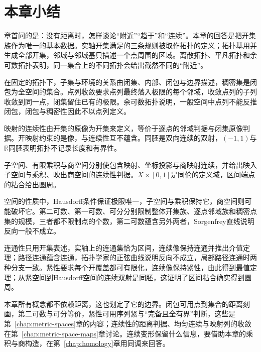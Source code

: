 \section{本章小结}
\label{sec:topo-summary}

章首问的是：没有距离时，怎样谈论“附近”“趋于”和“连续”。本章的回答是把开集族作为唯一的基本数据。实轴开集满足的三条规则被取作拓扑的定义；拓扑基用并生成全部开集，邻域与邻域基只描述一个点周围的区域。离散拓扑、平凡拓扑和余可数拓扑表明，同一集合上的不同拓扑会给出截然不同的“附近”。

在固定的拓扑下，子集与环境的关系由闭集、内部、闭包与边界描述，稠密集是闭包为全空间的集合。点列收敛要求点列最终落入极限的每个邻域，收敛点列的子列收敛到同一点，闭集留住已有的极限。余可数拓扑说明，一般空间中点列不能反推闭包，闭包与稠密性因此不以点列定义。

映射的连续性由开集的原像为开集来定义，等价于逐点的邻域判据与闭集原像判据。开映射约束的是像，与连续性互不蕴含。同胚是双向连续的双射，$(-1,1)$与$\mathbb R$同胚表明拓扑不记录长度和有界性。

子空间、有限乘积与商空间分别使包含映射、坐标投影与商映射连续，并给出映入子空间与乘积、映出商空间的连续性判据。$X\times[0,1]$是同伦的定义域，区间端点的粘合给出圆周。

空间的性质中，Hausdorff条件保证极限唯一，子空间与乘积保持它，商空间则可能破坏它。第二可数、第一可数、可分分别限制整体开集族、逐点邻域族和稠密点集的规模，三者都不限制点的个数，第二可数蕴含另外两者，Sorgenfrey直线说明反向一般不成立。

连通性只用开集表述，实轴上的连通集恰为区间，连续像保持连通并推出介值定理；路径连通蕴含连通，拓扑学家的正弦曲线说明反向不成立，局部路径连通时两种分支一致。紧性要求每个开覆盖都可有限化，连续像保持紧性，由此得到最值定理；从紧空间到Hausdorff空间的连续双射是同胚，这证明了区间粘合确实得到圆周。

本章所有概念都不依赖距离，这也划定了它的边界。闭包可用点到集合的距离刻画，第二可数与可分等价，紧性可用序列紧与“完备且全有界”判断，这些是第~\ref{chap:metric-spaces}章的内容；连续性的距离判据、均匀连续与映射列的收敛在第~\ref{chap:metric-space-maps}章讨论。连续变形保留什么信息，要借助本章的乘积与商构造，在第~\ref{chap:homology}章用同调来回答。
